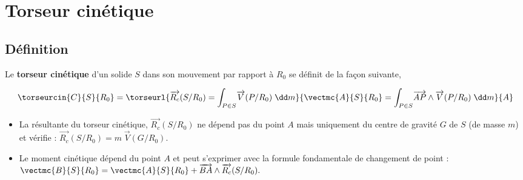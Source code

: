 \section{Torseur cinétique }

\subsection{Définition}
  \begin{defi}%
Le \textbf{torseur cinétique} d'un solide $S$ dans son mouvement par rapport à $R_0$ se définit de la façon suivante,

$$
\torseurcin{C}{S}{R_0}=\torseurl{\overrightarrow{R_c}(S/R_0)=\displaystyle{\int_{P\in S}}\overrightarrow{V}(P/R_0)\;\dd m}{\vectmc{A}{S}{R_0}=\displaystyle{\int_{P\in S}}\overrightarrow{AP}\wedge \overrightarrow{V}(P/R_0)\;\dd m}{A}
$$

\begin{itemize}
\item La résultante du torseur cinétique, $\overrightarrow{R_c}(S/R_0)$ ne dépend pas du point $A$ mais uniquement du centre de gravité $G$ de $S$ (de masse $m$) et vérifie :
$\overrightarrow{R_c}(S/R_0)=m\;\overrightarrow{V}(G/R_0).
$
\item Le moment cinétique dépend du point $A$ et peut s'exprimer avec la formule fondamentale de changement de point :
$
\vectmc{B}{S}{R_0}=\vectmc{A}{S}{R_0}+\overrightarrow{BA}\wedge \overrightarrow{R_c}(S/R_0).
$
\end{itemize}

\end{defi}


